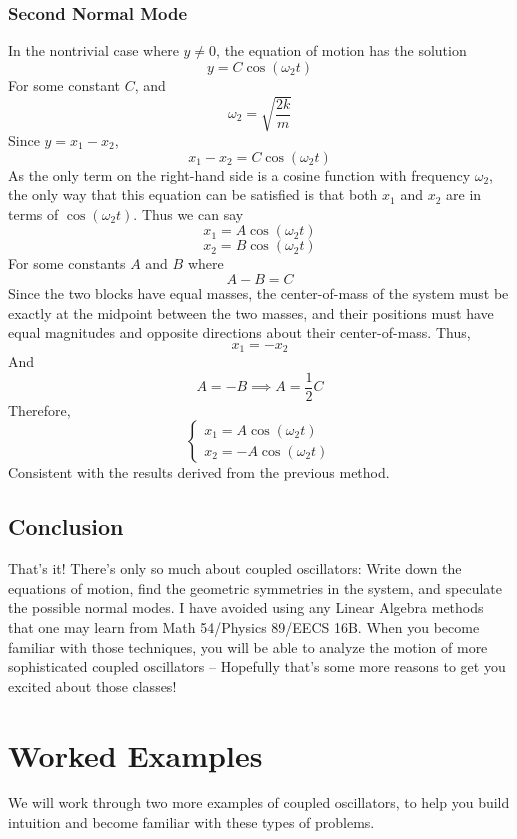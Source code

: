 \documentclass[11pt]{article}
\theoremstyle{gangnamstyle}{\newtheorem{definition}{Definition}[]}
\theoremstyle{gangnamstyle}{\newtheorem{example}{Example}[]}
\theoremstyle{gangnamstyle}{\newtheorem{problem}{Problem}[]}
\theoremstyle{gangnamstyle}{\newtheorem{warning}{Warning}[]}
\begin{document}
\subsubsection{Second Normal Mode}

In the nontrivial case where $y \neq 0$, the equation of motion has the solution
\[ y = C\cos(\omega_2 t) \]
For some constant $C$, and
\[ \omega_2 = \sqrt{\frac{2k}{m}} \]
Since $y = x_1 - x_2$, 
\[ x_1 - x_2 = C\cos(\omega_2 t) \]
As the only term on the right-hand side is a cosine function with frequency $\omega_2$, the only way that this equation can be satisfied is that both $x_1$ and $x_2$ are in terms of $\cos(\omega_2 t)$. Thus we can say
\[ x_1 = A\cos(\omega_2 t) \]
\[ x_2 = B\cos(\omega_2 t) \]
For some constants $A$ and $B$ where
\[ A - B = C \]
Since the two blocks have equal masses, the center-of-mass of the system must be exactly at the midpoint between the two masses, and their positions must have equal magnitudes and opposite directions about their center-of-mass. Thus, 
\[ x_1 = -x_2 \]
And
\[ A = -B \implies A = \frac{1}{2}C \]
Therefore, 
\[ \begin{cases}
x_1 = A\cos(\omega_2 t) \\
x_2 = - A\cos(\omega_2 t)
\end{cases} \]
Consistent with the results derived from the previous method. 

\subsection{Conclusion}
That's it! There's only so much about coupled oscillators: Write down the equations of motion, find the geometric symmetries in the system, and speculate the possible normal modes. I have avoided using any Linear Algebra methods that one may learn from Math 54/Physics 89/EECS 16B. When you become familiar with those techniques, you will be able to analyze the motion of more sophisticated coupled oscillators -- Hopefully that's some more reasons to get you excited about those classes! 

\pagebreak

\section{Worked Examples}

We will work through two more examples of coupled oscillators, to help you build intuition and become familiar with these types of problems. 
\end{document}

